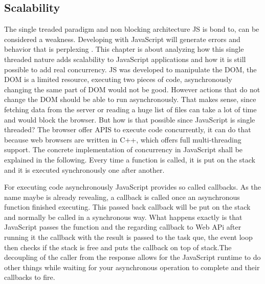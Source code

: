 \subsection{Scalability}
The single treaded paradigm and non blocking architecture \gls{JS}  is bond to, can be considered a weakness. Developing with JavaScript will generate errors and behavior that is perplexing . This chapter is about analyzing how this single threaded nature adds scalability to JavaScript applications and how it is still possible to add real concurrency. \gls{JS} was developed to manipulate the DOM, the DOM is a limited resource, executing two pieces of code, asynchronously changing the same part of DOM would not be good. However actions that do not change the DOM should be able to run asynchronously. That makes sense, since fetching data from the server or reading a huge list of files can take a lot of time and would block the browser. But how is that possible since JavaScript is single threaded? The browser offer APIS to execute code concurrently, it can do that because web browsers are written in C++, which offers full multi-threading support. The concrete implementation of concurrency in JavaScript shall be explained in the following. Every time a function is called, it is put on the stack and it is executed synchronously one after another.


 For executing code asynchronously JavaScript provides so called callbacks. As the name maybe is already revealing, a callback is called once an asynchronous function finished executing. This passed back callback will be put on the stack and normally be called in a synchronous way. What happens exactly is that JavaScript passes the function and the regarding callback to Web APi after running it the callback with the result  is passed to the task que, the event loop then checks if the stack is free and puts the callback on top of stack.The decoupling of the caller from the response allows for the JavaScript runtime to do other things while waiting for your asynchronous operation to complete and their callbacks to fire.








